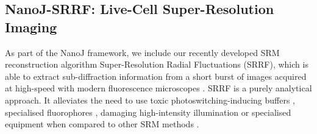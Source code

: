 \subsection*{NanoJ-SRRF: Live-Cell Super-Resolution Imaging}

 As part of the NanoJ framework, we include our recently developed SRM reconstruction algorithm Super-Resolution Radial Fluctuations (SRRF), which is able to extract sub-diffraction information from a short burst of images acquired at high-speed with modern fluorescence microscopes \cite{gustafsson2016fast,culley2018srrf}. SRRF is a purely analytical approach. It alleviates the need to use toxic photoswitching-inducing buffers \cite{henriques2011palm}, specialised fluorophores \cite{dempsey2011evaluation,henriques2009palm}, damaging high-intensity illumination \cite{waldchen2015light} or specialised equipment \cite{gustafsson2000surpassing,hell1994breaking} when compared to other SRM methods \cite{betzig2006imaging,rust2006sub,gustafsson2000surpassing,hell1994breaking}.
 
